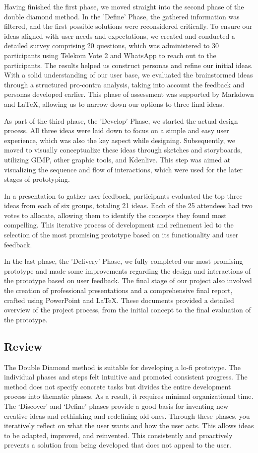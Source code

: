 \documentclass{article}
\begin{document}
Having finished the first phase, we moved straight into the second phase of the double diamond method.
In the 'Define' Phase, the gathered information was filtered, and the first possible solutions were reconsidered critically.
To ensure our ideas aligned with user needs and expectations, we created and conducted a detailed survey comprising 20 questions,
which was administered to 30 participants using Telekom Vote 2 and WhatsApp to reach out to the participants.
The results helped us construct personas and refine our initial ideas.
With a solid understanding of our user base, we evaluated the brainstormed ideas through a structured pro-contra analysis,
taking into account the feedback and personas developed earlier.
This phase of assessment was supported by Markdown and LaTeX, allowing us to narrow down our options to three final ideas.

As part of the third phase, the 'Develop' Phase, we started the actual design process.
All three ideas were laid down to focus on a simple and easy user experience, which was also the key aspect while designing.
Subsequently, we moved to visually conceptualize these ideas through sketches and storyboards,
utilizing GIMP, other graphic tools, and Kdenlive.
This step was aimed at visualizing the sequence and flow of interactions, which were used for the later stages of prototyping.

In a presentation to gather user feedback, participants evaluated the top three ideas from each of six groups, totaling 21 ideas.
Each of the 25 attendees had two votes to allocate, allowing them to identify the concepts they found most compelling.
This iterative process of development and refinement led to the selection of the most promising prototype
based on its functionality and user feedback.

In the last phase, the 'Delivery' Phase, we fully completed our most promising prototype
and made some improvements regarding the design and interactions of the prototype based on user feedback.
The final stage of our project also involved the creation of professional presentations and a comprehensive final report,
crafted using PowerPoint and LaTeX. These documents provided a detailed overview of the project process,
from the initial concept to the final evaluation of the prototype.

\subsection{Review}
The Double Diamond method is suitable for developing a lo-fi prototype.
The individual phases and steps felt intuitive and promoted consistent progress.
The method does not specify concrete tasks but divides the entire development process into thematic phases.
As a result, it requires minimal organizational time.
The ‘Discover’ and ‘Define’ phases provide a good basis for inventing new creative ideas and rethinking and redefining old ones.
Through these phases, you iteratively reflect on what the user wants and how the user acts.
This allows ideas to be adapted, improved, and reinvented.
This consistently and proactively prevents a solution from being developed that does not appeal to the user.
\end{document}
